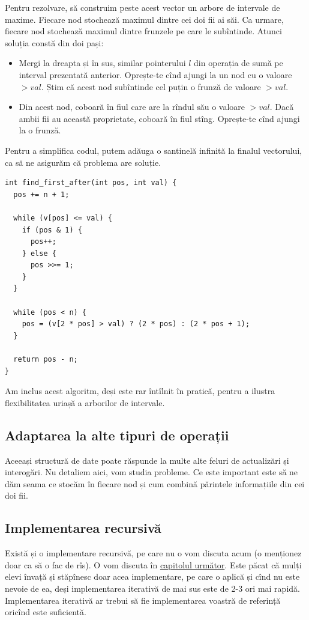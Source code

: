 Pentru rezolvare, să construim peste acest vector un arbore de intervale de maxime. Fiecare nod stochează maximul dintre cei doi fii ai săi. Ca urmare, fiecare nod stochează maximul dintre frunzele pe care le subîntinde. Atunci soluția constă din doi pași:

\begin{itemize}
  \item Mergi la dreapta și în sus, similar pointerului $l$ din operația de sumă pe interval prezentată anterior. Oprește-te cînd ajungi la un nod cu o valoare $> val$. Știm că acest nod subîntinde cel puțin o frunză de valoare $> val$.
  \item Din acest nod, coboară în fiul care are la rîndul său o valoare $> val$. Dacă ambii fii au această proprietate, coboară în fiul stîng. Oprește-te cînd ajungi la o frunză.
\end{itemize}

Pentru a simplifica codul, putem adăuga o santinelă infinită la finalul vectorului, ca să ne asigurăm că problema are soluție.

\begin{verbatim}
int find_first_after(int pos, int val) {
  pos += n + 1;

  while (v[pos] <= val) {
    if (pos & 1) {
      pos++;
    } else {
      pos >>= 1;
    }
  }

  while (pos < n) {
    pos = (v[2 * pos] > val) ? (2 * pos) : (2 * pos + 1);
  }

  return pos - n;
}
\end{verbatim}

Am inclus acest algoritm, deși este rar întîlnit în pratică, pentru a ilustra flexibilitatea uriașă a arborilor de intervale.

\subsection{Adaptarea la alte tipuri de operații}

Aceeași structură de date poate răspunde la multe alte feluri de actualizări și interogări. Nu detaliem aici, vom studia probleme. Ce este important este să ne dăm seama ce stocăm în fiecare nod și cum combină părintele informațiile din cei doi fii.

\subsection{Implementarea recursivă}

Există și o implementare recursivă, pe care nu o vom discuta acum (o menționez doar ca să o fac de rîs). O vom discuta în \hyperref[chapter:segment-trees-lazy]{capitolul următor}. Este păcat că mulți elevi învață și stăpînesc doar acea implementare, pe care o aplică și cînd nu este nevoie de ea, deși implementarea iterativă de mai sus este de 2-3 ori mai rapidă. Implementarea iterativă ar trebui să fie implementarea voastră de referință oricînd este suficientă.

